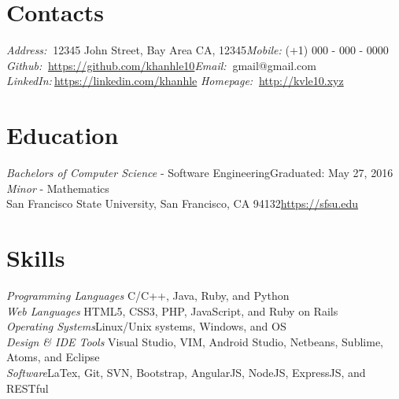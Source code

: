 \documentclass[letter]{res}
\newcommand\tab[1][0.5cm]{\hspace*{#1}}
\begin{document}
\begin{resume}
  \noindent\makebox[\linewidth]{\rule{\paperwidth}{0.5pt}}
\section{Contacts}\vspace{1mm}
{\sl Address:}$\>$ {\tab12345 John Street, Bay Area CA, 12345}\hfill{\sl Mobile:  \tab} {(+1) 000 - 000 - 0000}\\
{\sl Github:}$\>$  \tab\href{https://www.github.com/khanhle10}{ https://github.com/khanhle10}\hfill{\sl Email:\hspace{4mm}}$\>$ {gmail@gmail.com}\\
{\sl LinkedIn:}$\>$\tab\href{https://www.linkedin.com/pub/khanh-le/97/609/593}{https://linkedin.com/khanhle}
\hfill{\sl Homepage:\hspace{8mm}}$\>$ \href{http://www.kvle10.xyz}{http://kvle10.xyz}
\section{Education}\vspace{1mm}
{\sl Bachelors of Computer Science} - Software Engineering\hfill Graduated: May 27, 2016\\
{\sl Minor} - Mathematics \\
San Francisco State University, San Francisco, CA 94132\hfill \href{http://cs.sfsu.edu/}{https://sfsu.edu}
\section{Skills}
\vspace{1mm}
{\sl Programming Languages}\hspace{1em} C/C++, Java, Ruby, and Python\\
{\sl Web Languages}\hspace{5em} HTML5, CSS3, PHP, JavaScript, and Ruby on Rails\\
{\sl Operating Systems}\hspace{4em}Linux/Unix systems, Windows, and OS \\
{\sl Design \& IDE Tools}\hspace{3em} Visual Studio, VIM, Android Studio, Netbeans, Sublime, Atoms, and Eclipse \\
{\sl Software}\hspace{8.5em}LaTex, Git, SVN, Bootstrap, AngularJS, NodeJS, ExpressJS, and RESTful

\end{resume}
\end{document}
